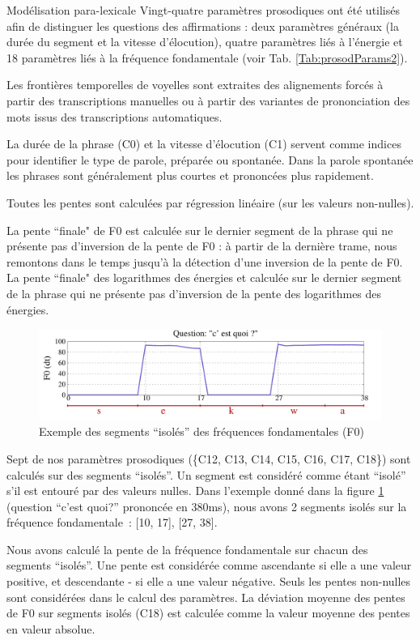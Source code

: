 \documentclass{style/these}
\begin{document}
\begin{part}{Modélisation para-lexicale}
Vingt-quatre paramètres prosodiques ont été utilisés afin de distinguer les questions des affirmations : deux paramètres généraux (la durée du segment et la vitesse d'élocution), quatre paramètres liés à l'énergie et 18 paramètres liés à la fréquence fondamentale (voir Tab. \ref{Tab:prosodParams2}). 

Les frontières temporelles de voyelles sont extraites des alignements forcés à partir des transcriptions manuelles ou à partir des variantes de prononciation des mots issus des transcriptions automatiques. 

La durée de la phrase (C0) et la vitesse d'élocution (C1) servent comme indices pour identifier le type de parole, préparée ou spontanée. 
Dans la parole spontanée les phrases sont généralement plus courtes et prononcées plus rapidement. 

Toutes les pentes sont calculées par régression linéaire (sur les valeurs non-nulles). 

La pente ``finale" de F0 est calculée sur le dernier segment de la phrase qui ne présente pas d'inversion de la pente de F0 : à partir de la dernière trame, nous remontons dans le temps jusqu'à la détection d'une inversion de la pente de F0. 
La pente ``finale" des logarithmes des énergies et calculée sur le dernier segment de la phrase qui ne présente pas d'inversion de la pente des logarithmes des énergies. 

\begin{figure}[h!]
\centering
\includegraphics[scale=0.58]{images/results/F0prosody.pdf}
\caption{Exemple des segments ``isolés'' des fréquences fondamentales (F0)}
\label{Fig:exF0}
\end{figure}

Sept de nos paramètres prosodiques  (\{C12, C13, C14, C15, C16, C17, C18\}) sont calculés sur des segments ``isolés''. 
Un segment est considéré comme étant ``isolé'' s'il est entouré par des valeurs nulles. 
Dans l'exemple donné dans la figure \ref{Fig:exF0} (question ``c'est quoi?'' prononcée en 380ms), nous avons 2 segments isolés sur la fréquence fondamentale~: [10, 17], [27, 38]. 

Nous avons calculé la pente de la fréquence fondamentale sur chacun des segments ``isolés''. 
Une pente est considérée comme ascendante si elle a une valeur positive, et descendante - si elle a une valeur négative. 
Seuls les pentes non-nulles sont considérées dans le calcul des paramètres. 
La déviation moyenne des pentes de F0 sur segments isolés (C18) est calculée comme la valeur moyenne des pentes en valeur absolue. 


\end{part}
\end{document}
